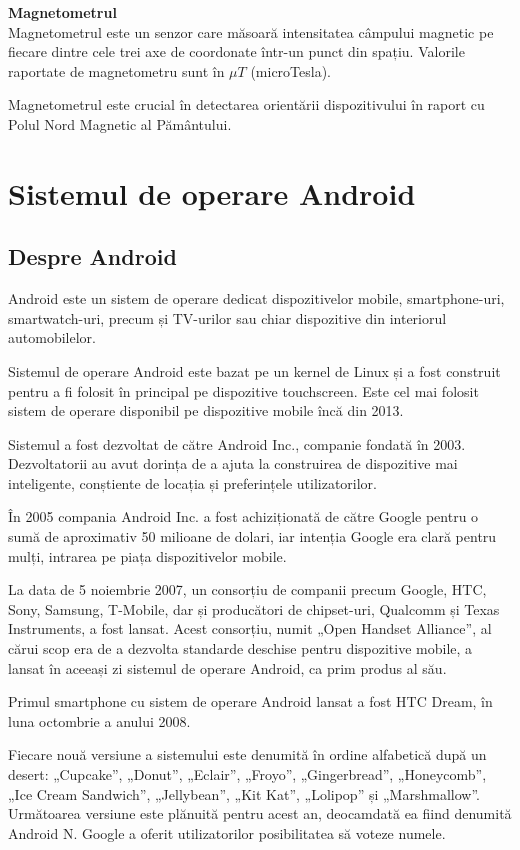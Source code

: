 \documentclass[12pt,a4paper]{article}
\begin{document}
\textbf{Magnetometrul}\\
Magnetometrul este un senzor care măsoară intensitatea câmpului magnetic  pe fiecare dintre cele trei axe de coordonate într-un punct din spațiu. Valorile raportate de magnetometru sunt în $\mu T$ (microTesla).

Magnetometrul este crucial în detectarea orientării dispozitivului în raport cu Polul Nord Magnetic al Pământului.

\newpage
\section{Sistemul de operare Android} \label{DetaliiAndroidOS}
\subsection{Despre Android \cite{AndroidHistoryAndroidCentral}} 
Android este un sistem de operare dedicat dispozitivelor mobile, smartphone-uri, smartwatch-uri, precum și TV-urilor sau chiar dispozitive din interiorul automobilelor.

Sistemul de operare Android este bazat pe un kernel de Linux și a fost construit pentru a fi folosit în principal pe dispozitive touchscreen. Este cel mai folosit sistem de operare disponibil pe dispozitive mobile încă din 2013.

Sistemul a fost dezvoltat de către Android Inc., companie fondată în 2003. Dezvoltatorii au avut dorința de a ajuta la construirea de dispozitive mai inteligente, conștiente de locația și preferințele utilizatorilor.

În 2005 compania Android Inc. a fost achiziționată de către Google pentru o sumă de aproximativ 50 milioane de dolari, iar intenția Google era clară pentru mulți, intrarea pe piața dispozitivelor mobile.

La data de 5 noiembrie 2007, un consorțiu de companii precum Google, HTC, Sony, Samsung, T-Mobile, dar și producători de chipset-uri, Qualcomm și Texas Instruments, a fost lansat. Acest consorțiu, numit „Open Handset Alliance”, al cărui scop era de a dezvolta standarde deschise pentru dispozitive mobile, a lansat în aceeași zi sistemul de operare Android, ca prim produs al său.

Primul smartphone cu sistem de operare Android lansat a fost HTC Dream, în luna octombrie a anului 2008.

Fiecare nouă versiune a sistemului este denumită în ordine alfabetică după un desert: „Cupcake”, „Donut”, „Eclair”, „Froyo”, „Gingerbread”, „Honeycomb”, „Ice Cream Sandwich”, „Jellybean”, „Kit Kat”, „Lolipop” și „Marshmallow”. Următoarea versiune este plănuită pentru acest an, deocamdată ea fiind denumită Android N. Google a oferit utilizatorilor posibilitatea să voteze numele.
\end{document}
